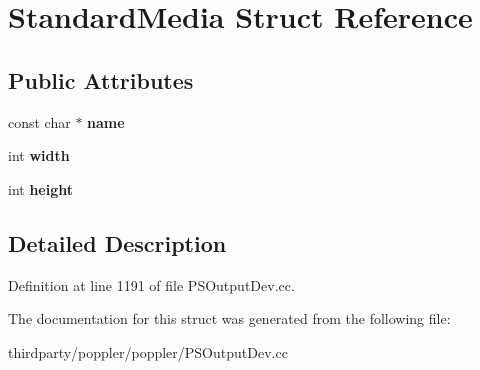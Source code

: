 \hypertarget{struct_standard_media}{}\section{Standard\+Media Struct Reference}
\label{struct_standard_media}
\subsection*{Public Attributes}
\begin{DoxyCompactItemize}
\item 
\mbox{\label{struct_standard_media_a52f6d5e6ab7d93930aacc37ad6027bd5}} 
const char $\ast$ {\bfseries name}
\item 
\mbox{\label{struct_standard_media_afe5818445a9f531fea3b269ea4d45c4e}} 
int {\bfseries width}
\item 
\mbox{\label{struct_standard_media_a34128024884a0459e674b3118a6db74c}} 
int {\bfseries height}
\end{DoxyCompactItemize}


\subsection{Detailed Description}


Definition at line 1191 of file P\+S\+Output\+Dev.\+cc.



The documentation for this struct was generated from the following file\+:\begin{DoxyCompactItemize}
\item 
thirdparty/poppler/poppler/P\+S\+Output\+Dev.\+cc\end{DoxyCompactItemize}
